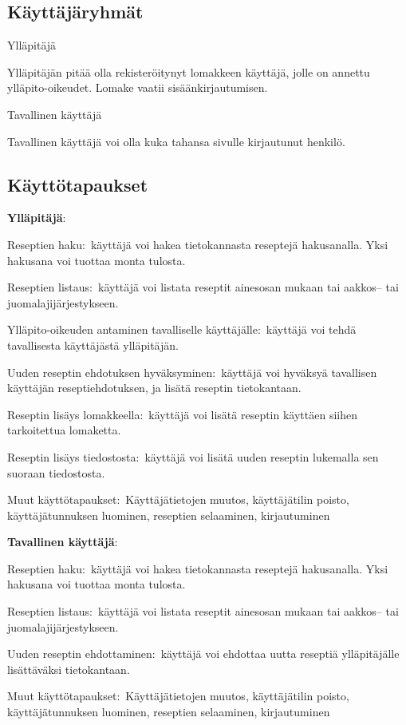 \documentclass[a4paper]{article}
\begin{document}
\subsection{Käyttäjäryhmät}

\begin{flushleft}Ylläpitäjä\end{flushleft}

Ylläpitäjän pitää olla rekisteröitynyt lomakkeen käyttäjä, jolle on annettu ylläpito-oikeudet. Lomake vaatii sisäänkirjautumisen.

\begin{flushleft}Tavallinen käyttäjä\end{flushleft}

Tavallinen käyttäjä voi olla kuka tahansa sivulle kirjautunut henkilö. 

\subsection{Käyttötapaukset}

\begin{flushleft}\textbf{Ylläpitäjä\(\colon\)} \end{flushleft}

Reseptien haku\(\colon\) käyttäjä voi hakea tietokannasta reseptejä hakusanalla. Yksi hakusana voi tuottaa monta tulosta.

Reseptien listaus\(\colon\) käyttäjä voi listata reseptit ainesosan mukaan tai aakkos-- tai juomalajijärjestykseen.

Ylläpito-oikeuden antaminen tavalliselle käyttäjälle\(\colon\) käyttäjä voi tehdä tavallisesta käyttäjästä ylläpitäjän. 

Uuden reseptin ehdotuksen hyväksyminen\(\colon\) käyttäjä voi hyväksyä tavallisen käyttäjän reseptiehdotuksen, ja lisätä reseptin tietokantaan.

Reseptin lisäys lomakkeella\(\colon\) käyttäjä voi lisätä reseptin käyttäen siihen tarkoitettua lomaketta.

Reseptin lisäys tiedostosta\(\colon\) käyttäjä voi lisätä uuden reseptin lukemalla sen suoraan tiedostosta. 

Muut käyttötapaukset\(\colon\) Käyttäjätietojen muutos, käyttäjätilin poisto, käyttäjätunnuksen luominen, reseptien selaaminen, kirjautuminen

\begin{flushleft}\textbf{Tavallinen käyttäjä\(\colon\)}\end{flushleft}

Reseptien haku\(\colon\) käyttäjä voi hakea tietokannasta reseptejä hakusanalla. Yksi hakusana voi tuottaa monta tulosta.

Reseptien listaus\(\colon\) käyttäjä voi listata reseptit ainesosan mukaan tai aakkos-- tai juomalajijärjestykseen.

Uuden reseptin ehdottaminen\(\colon\) käyttäjä voi ehdottaa uutta reseptiä ylläpitäjälle lisättäväksi tietokantaan.
 
Muut käyttötapaukset\(\colon\) Käyttäjätietojen muutos, käyttäjätilin poisto, käyttäjätunnuksen luominen, reseptien selaaminen, kirjautuminen
\end{document}
